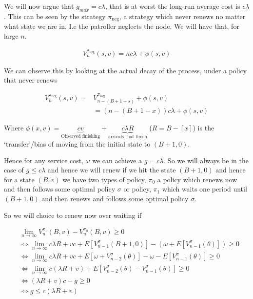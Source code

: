 \documentclass[a4paper,10pt]{article}
\newcommand{\ceil}[1]{\left \lceil #1 \right \rceil}
\theoremstyle{definition}
\theoremstyle{definition}
\theoremstyle{remark}
\theoremstyle{definition}
\begin{document}
We will now argue that $g_{max}=c \lambda$, that is at worst the  long-run average cost is $c \lambda$. This can be seen by the strategy $\pi_{\text{neg}}$, a strategy which never renews no matter what state we are in. I.e the patroller neglects the node. We will have that, for large $n$.

\begin{align*}
V_{n}^{\pi_{\text{neg}}}(s,v)=n c \lambda + \phi(s,v)
\end{align*}

We can observe this by looking at the actual decay of the process, under a policy that never renews

\begin{align*}
V_{n}^{\pi_{\text{neg}}}(s,v)=& V_{n-(B+1-s)}^{\pi_{\text{neg}}} + \phi(s,v) \\
&=(n-(B+1-x)) c \lambda + \phi(s,v)
\end{align*}

Where $\phi(x,v)= \underbrace{c v}_{\text{Observed finishing}} + \underbrace{c \lambda R}_{\text{arrivals that finish}}$ ($R=B-\ceil{x}$) is the `transfer'/bias of moving from the initial state to $(B+1,0)$.

Hence for any service cost, $\omega$ we can achieve a $g= c \lambda$. So we will always be in the case of $g \leq c \lambda$ and hence we will renew if we hit the state $(B+1,0)$ and hence for a state $(B,v)$ we have two types of policy, $\pi_{0}$ a policy which renews now and then follows some optimal policy $\sigma$ or policy, $\pi_{1}$ which waits one period until $(B+1,0)$ and then renews and follows some optimal policy $\sigma$.

So we will choice to renew now over waiting if

\begin{align*}
&\lim\limits_{n \rightarrow \infty} V_{n}^{\pi_{1}} (B,v) - V_{n}^{\pi_{0}}(B,v) \geq 0 \\
& \iff \lim\limits_{n \rightarrow \infty} c \lambda R + vc + E[V_{n-1}^{\sigma}(B+1,0)] - (\omega + E[V_{n-1}^{\sigma}(\theta)]) \geq 0 \\
& \iff \lim\limits_{n \rightarrow \infty} c \lambda R + v c  + E[ \omega + V_{n-2}^{\sigma}(\theta)] - \omega - E[V_{n-1}^{\sigma}(\theta)] \geq 0 \\
& \iff \lim\limits_{n \rightarrow \infty} c(\lambda R + v) + E[V_{n-2}^{\sigma}(\theta) - V_{n-1}^{\sigma}(\theta)] \geq 0 \\
& \iff (\lambda R+v)c - g \geq 0 \\
& \iff g \leq c (\lambda R +v) 
\end{align*}
\end{document}
